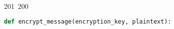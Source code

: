 201~200~\documentclass{article}
\begin{document}
\begin{lstlisting}[language=Python, caption=Encrypting a Message with ChaCha20-Poly1305]
	                                                                                                                                                                                                                                                                                                	                                                                                                                                        	    	                                                                                                	                                                                                                                                                                                                                                                                                                                                	                                                                        	                                                                        	                                                                                                                                        	                                                                                                                                                                                                                        	                                                                                                                            	                                                                	                                                                                                    def encrypt_message(encryption_key, plaintext):

\end{lstlisting}
\end{document}
